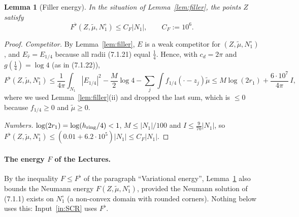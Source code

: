 \documentclass[11pt]{article}
\newtheorem{sublemma}{Lemma}[theorem]
\theoremstyle{definition}
\theoremstyle{remark}
\begin{document}
\begin{sublemma}[Filler energy]\label{lem:filler-energy}
In the situation of Lemma~\ref{lem:filler}, the points $Z$ satisfy
\[
F^\flat(Z,\tilde\mu,N_1^\circ)\le C_F|N_1|,\qquad C_F:=10^6 .
\]
\end{sublemma}
\begin{proof}
\emph{Competitor.} By Lemma~\ref{lem:filler}, $E$ is a weak competitor for $(Z,\tilde\mu,N_1^\circ)$, and
$E_{\hat r}=E_{1/4}$ because all radii (7.1.21) equal $\tfrac14$. Hence, with $c_d=2\pi$ and $g(\tfrac14)=\log4$
(as in (7.1.22)),
\[
F^\flat(Z,\tilde\mu,N_1^\circ)\le\frac1{4\pi}\int_{N_1}|E_{1/4}|^2-\frac M2\log4-\sum_j\int f_{1/4}(\cdot-z_j)\tilde\mu
\le M\log(2r_1)+\frac{6\cdot10^7}{4\pi}\,I ,
\]
where we used Lemma~\ref{lem:filler}(ii) and dropped the last sum, which is $\le0$ because $f_{1/4}\ge0$ and
$\tilde\mu\ge0$.

\emph{Numbers.} $\log(2r_1)=\log(h_{\rm ring}/4)<1$, $M\le|N_1|/100$ and $I\le\tfrac9{70}|N_1|$, so
$F^\flat(Z,\tilde\mu,N_1^\circ)\le(0.01+6.2\cdot10^5)|N_1|\le C_F|N_1|$.
\end{proof}

\paragraph{The energy $F$ of the Lectures.} By the inequality $F\le F^\flat$ of the paragraph ``Variational energy'',
Lemma~\ref{lem:filler-energy} also bounds the Neumann energy $F(Z,\tilde\mu,N_1^\circ)$, provided the
Neumann solution of (7.1.1) exists on $N_1^\circ$ (a non-convex domain with rounded corners). Nothing below
uses this: Input~\ref{in:SCR} uses $F^\flat$.
\end{document}
